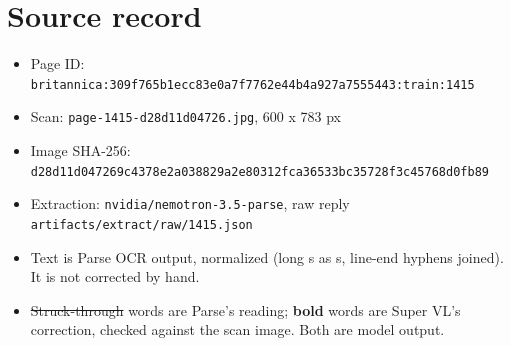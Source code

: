 \documentclass[10pt]{article}
\begin{document}
\section*{Source record}
\begin{itemize}
\item Page ID: \texttt{britannica:309f765b1ecc83e0a7f7762e44b4a927a7555443:train:1415}
\item Scan: \texttt{page-1415-d28d11d04726.jpg}, 600 x 783 px
\item Image SHA-256: \texttt{\small d28d11d047269c4378e2a038829a2e80312fca36533bc35728f3c45768d0fb89}
\item Extraction: \texttt{nvidia/nemotron-3.5-parse}, raw reply \texttt{artifacts/extract/raw/1415.json}
\item Text is Parse OCR output, normalized (long s as s, line-end hyphens joined). It is not corrected by hand.
\item \sout{Struck-through} words are Parse's reading; \textbf{bold} words are Super VL's correction, checked against the scan image. Both are model output.
\end{itemize}
\end{document}
